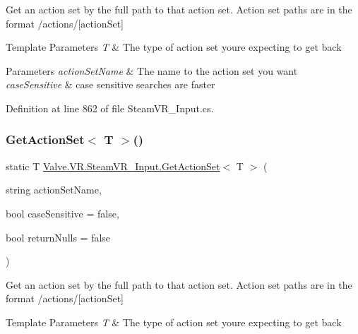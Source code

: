 Get an action set by the full path to that action set. Action set paths are in the format /actions/\mbox{[}action\+Set\mbox{]} 


\begin{DoxyTemplParams}{Template Parameters}
{\em T} & The type of action set you\textquotesingle{}re expecting to get back\\
\hline
\end{DoxyTemplParams}

\begin{DoxyParams}{Parameters}
{\em action\+Set\+Name} & The name to the action set you want\\
\hline
{\em case\+Sensitive} & case sensitive searches are faster\\
\hline
\end{DoxyParams}


Definition at line 862 of file Steam\+V\+R\+\_\+\+Input.\+cs.

\mbox{\label{class_valve_1_1_v_r_1_1_steam_v_r___input_a8c97236e06841de3c07e5685aa875359}} 
\subsubsection{\texorpdfstring{GetActionSet$<$ T $>$()}{GetActionSet< T >()}}
{\footnotesize\ttfamily static T \mbox{\hyperlink{class_valve_1_1_v_r_1_1_steam_v_r___input_a645e9f34de97217c31c20ba913c8d3e6}{Valve.\+V\+R.\+Steam\+V\+R\+\_\+\+Input.\+Get\+Action\+Set}}$<$ T $>$ (\begin{DoxyParamCaption}\item[{string}]{action\+Set\+Name,  }\item[{bool}]{case\+Sensitive = {\ttfamily false},  }\item[{bool}]{return\+Nulls = {\ttfamily false} }\end{DoxyParamCaption})\hspace{0.3cm}{\ttfamily [static]}}



Get an action set by the full path to that action set. Action set paths are in the format /actions/\mbox{[}action\+Set\mbox{]} 


\begin{DoxyTemplParams}{Template Parameters}
{\em T} & The type of action set you\textquotesingle{}re expecting to get back\\
\hline
\end{DoxyTemplParams}

